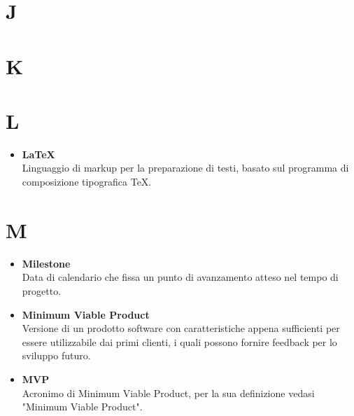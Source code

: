 \documentclass[a4paper,12pt]{article}
\begin{document}
        \section*{J} {
            
        }
        \newpage

        \section*{K} {
            
        }
        \newpage

        \section*{L} {
            \begin{itemize}
                \item \textbf{LaTeX}\\
                    Linguaggio di markup per la preparazione di testi, basato sul programma di composizione tipografica TeX.
            \end{itemize}
        }
        \newpage

        \section*{M} {
            \begin{itemize}
                \item \textbf{Milestone}\\
                    Data di calendario che fissa un punto di avanzamento atteso nel tempo di progetto.
                \item \textbf{Minimum Viable Product}\\
                    Versione di un prodotto software con caratteristiche appena sufficienti per essere utilizzabile dai primi clienti, i quali possono fornire feedback per lo sviluppo futuro.
                \item \textbf{MVP}\\
                    Acronimo di Minimum Viable Product, per la sua definizione vedasi "Minimum Viable Product".
            \end{itemize}
        }
        \newpage
\end{document}
